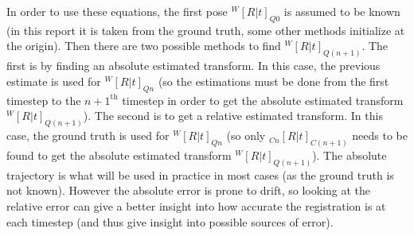 \documentclass[12pt,a4paper]{article}
\begin{document}
    \bigskip \noindent
    In order to use these equations, the first pose ${}^W[R|t]_{Q0}$ is assumed to be known (in this report it is taken from the ground truth, some other methods initialize at the origin). Then there are two possible methods to find ${}^W[R|t]_{Q(n+1)}$. The first is by finding an absolute estimated transform. In this case, the previous estimate is used for ${}^W[R|t]_{Qn}$ (so the estimations must be done from the first timestep to the $n+1^{\text{th}}$ timestep in order to get the absolute estimated transform ${}^W[R|t]_{Q(n+1)}$). The second is to get a relative estimated transform. In this case, the ground truth is used for ${}^W[R|t]_{Qn}$ (so only ${}_{Cn}[R|t]_{C(n+1)}$ needs to be found to get the absolute estimated transform ${}^W[R|t]_{Q(n+1)}$). The absolute trajectory is what will be used in practice in most cases (as the ground truth is not known). However the absolute error is prone to drift, so looking at the relative error can give a better insight into how accurate the registration is at each timestep (and thus give insight into possible sources of error).



\end{document}
